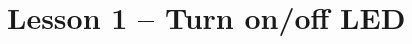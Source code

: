 \documentclass[10pt,twoside,english]{_support/latex/sbabook/sbabook}
\begin{document}
\frontmatter
\pagestyle{plain}

\tableofcontents*
\clearpage\listoffigures

\mainmatter

\chapter{Lesson 1 – Turn on/off LED }

\backmatter

\end{document}
